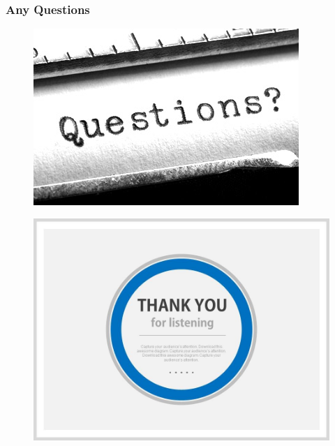 \documentclass[handout]{beamer}
\begin{document}
\begin{frame}
\frametitle{Any Questions}

\begin{figure}[h]
         \begin{center}
\includegraphics[scale=0.4,angle=360]{questions.jpg}
\end{center}
\end{figure}
\end{frame}


\begin{frame}
\begin{figure}[h]
         \begin{center}
\includegraphics[scale=0.2,angle=360]{thanks.jpg}
\end{center}
\end{figure}

\end{frame}




%




\end{document}
